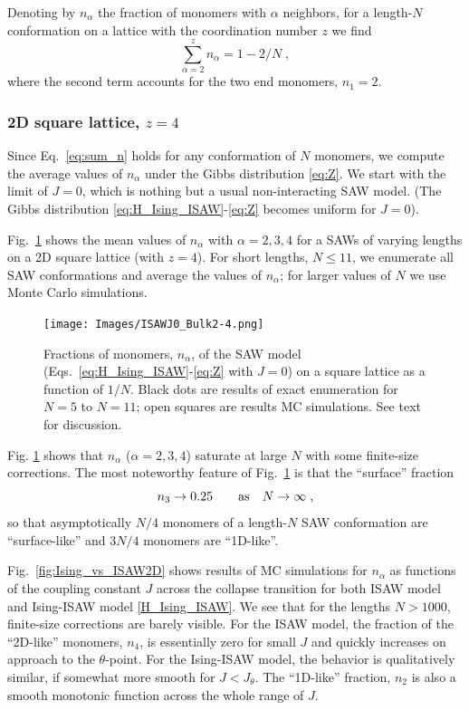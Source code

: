 \documentclass[a4paper]{jpconf}
\begin{document}
Denoting by $n_\alpha$ the fraction of monomers with $\alpha$ neighbors, 
for a length-$N$ conformation on a lattice with the coordination number $z$
we find
%
$$
\sum_{\alpha=2}^z n_\alpha = 1 - 2/N \;,
\label{eq:sum_n}
$$
%
where the second term accounts for the two end monomers, $n_1 =2$.


\subsubsection{2D square lattice, $z=4$}

Since Eq.\ \eqref{eq:sum_n} holds for any conformation of $N$ monomers, we
compute the average values of $n_\alpha$ under the Gibbs distribution \eqref{eq:Z}.
We start with the limit of $J=0$, which is nothing but a usual non-interacting SAW model.
(The Gibbs distribution \eqref{eq:H_Ising_ISAW}-\eqref{eq:Z}
becomes uniform for $J=0$).

Fig.\ \ref{fig:finite_size_SAW} shows the mean values of $n_\alpha$ with $\alpha=2, 3, 4$
for a SAWs of varying lengths on a 2D square lattice (with $z=4$).
For short lengths, $N \leqslant 11$, we enumerate all SAW conformations and
average the values of $n_\alpha$; for larger values of $N$ we use Monte Carlo simulations.
%
\begin{figure}[h!]
    \centering
    \texttt{[image: Images/ISAWJ0\_Bulk2-4.png]}
    \caption{Fractions of monomers, $n_\alpha$, of the SAW
model (Eqs.\ \eqref{eq:H_Ising_ISAW}-\eqref{eq:Z} with $J=0$) on a square lattice as a function
of $1/N$. Black dots are results of exact enumeration for $N = 5$ to $N=11$; 
open squares are results MC simulations. See text for discussion.}
    \label{fig:finite_size_SAW}
\end{figure}
%

Fig. \ref{fig:finite_size_SAW} shows that $n_\alpha$ ($\alpha=2, 3, 4$) saturate
at large $N$ with some finite-size corrections. The most noteworthy feature of
Fig.\ \ref{fig:finite_size_SAW} is that the ``surface'' fraction
%
$$
n_3 \to 0.25 \qquad\text{as\quad}N\to\infty \;,
$$
%
so that asymptotically $N/4$ monomers of a length-$N$ SAW conformation are ``surface-like'' and
$3 N/4$ monomers are ``1D-like''.


Fig.\ \ref{fig:Ising_vs_ISAW2D} shows results of MC simulations for
$n_\alpha$ as functions of the coupling constant $J$ across the collapse transition
for both ISAW model and Ising-ISAW model \eqref{H_Ising_ISAW}.
We see that for the lengths $N > 1000$, finite-size corrections are barely visible.
For the ISAW model,  the fraction of the ``2D-like'' monomers, $n_4$, is
essentially zero for small $J$ and quickly increases on approach to the $\theta$-point.
For the Ising-ISAW model, the behavior is qualitatively similar, if somewhat
more smooth for $J < J_\theta$. The ``1D-like'' fraction, $n_2$ is also a smooth
monotonic function across the whole range of $J$. 
\end{document}
